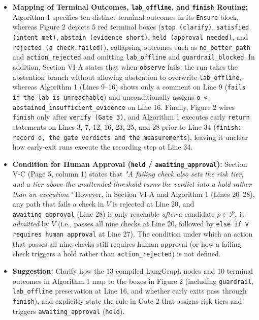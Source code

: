 \documentclass[11pt,a4paper]{article}
\begin{document}
\begin{enumerate}[leftmargin=1.6em,itemsep=3pt]
\begin{itemize}[leftmargin=1.8em,itemsep=2pt]
\item \textbf{Mapping of Terminal Outcomes, \texttt{lab\_offline}, and \texttt{finish} Routing:} Algorithm 1 specifies ten distinct terminal outcomes in its \texttt{Ensure} block, whereas Figure 2 depicts 5 red terminal boxes (\texttt{stop (clarify)}, \texttt{satisfied (intent met)}, \texttt{abstain (evidence short)}, \texttt{held (approval needed)}, and \texttt{rejected (a check failed)}), collapsing outcomes such as \texttt{no\_better\_path} and \texttt{action\_rejected} and omitting \texttt{lab\_offline} and \texttt{guardrail\_blocked}. In addition, Section VI-A states that when \texttt{observe} fails, the run takes the abstention branch without allowing abstention to overwrite \texttt{lab\_offline}, whereas Algorithm 1 (Lines 9–16) shows only a comment on Line 9 (\texttt{fails if the lab is unreachable}) and unconditionally assigns \texttt{o <- abstained\_insufficient\_evidence} on Line 16. Finally, Figure 2 wires \texttt{finish} only after \texttt{verify (Gate 3)}, and Algorithm 1 executes early \texttt{return} statements on Lines 3, 7, 12, 16, 23, 25, and 28 prior to Line 34 (\texttt{finish: record o, the gate verdicts and the measurements}), leaving it unclear how early-exit runs execute the recording step at Line 34.
\item \textbf{Condition for Human Approval (\texttt{held} / \texttt{awaiting\_approval}):} Section V-C (Page 5, column 1) states that \emph{"A failing check also sets the risk tier, and a tier above the unattended threshold turns the verdict into a hold rather than an execution."} However, in Section VI-A and Algorithm 1 (Lines 20–28), any path that fails a check in $V$ is rejected at Line 20, and \texttt{awaiting\_approval} (Line 28) is only reachable \emph{after} a candidate $p \in \mathcal{P}_c$ is \emph{admitted} by $V$ (i.e., passes all nine checks at Line 20, followed by \texttt{else if V requires human approval} at Line 27). The condition under which an action that passes all nine checks still requires human approval (or how a failing check triggers a hold rather than \texttt{action\_rejected}) is not defined.
\item \textbf{Suggestion:} Clarify how the 13 compiled LangGraph nodes and 10 terminal outcomes in Algorithm 1 map to the boxes in Figure 2 (including \texttt{guardrail}, \texttt{lab\_offline} preservation at Line 16, and whether early exits pass through \texttt{finish}), and explicitly state the rule in Gate 2 that assigns risk tiers and triggers \texttt{awaiting\_approval} (\texttt{held}).
\end{itemize}
\end{enumerate}
\end{document}
